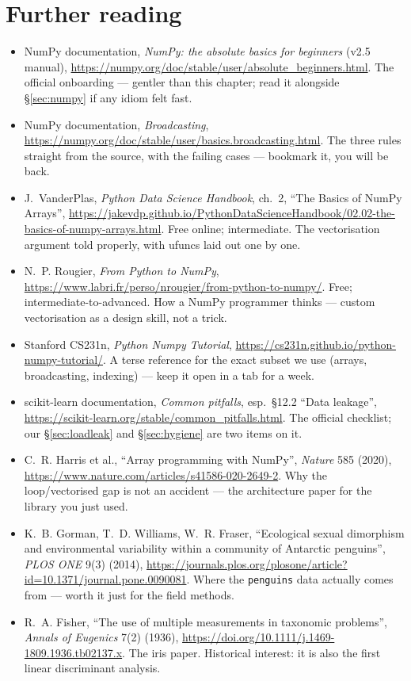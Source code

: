 \section*{Further reading}

\begin{itemize}
\item NumPy documentation, \emph{NumPy: the absolute basics for beginners}
  (v2.5 manual), \url{https://numpy.org/doc/stable/user/absolute_beginners.html}.
  The official onboarding --- gentler than this chapter; read it alongside
  \S\ref{sec:numpy} if any idiom felt fast.
\item NumPy documentation, \emph{Broadcasting},
  \url{https://numpy.org/doc/stable/user/basics.broadcasting.html}. The three
  rules straight from the source, with the failing cases --- bookmark it, you
  will be back.
\item J.~VanderPlas, \emph{Python Data Science Handbook}, ch.~2, ``The Basics
  of NumPy Arrays'', \url{https://jakevdp.github.io/PythonDataScienceHandbook/02.02-the-basics-of-numpy-arrays.html}.
  Free online; intermediate. The vectorisation argument told properly, with
  ufuncs laid out one by one.
\item N.~P. Rougier, \emph{From Python to NumPy},
  \url{https://www.labri.fr/perso/nrougier/from-python-to-numpy/}. Free;
  intermediate-to-advanced. How a NumPy programmer thinks --- custom
  vectorisation as a design skill, not a trick.
\item Stanford CS231n, \emph{Python Numpy Tutorial},
  \url{https://cs231n.github.io/python-numpy-tutorial/}. A terse reference for
  the exact subset we use (arrays, broadcasting, indexing) --- keep it open in
  a tab for a week.
\item scikit-learn documentation, \emph{Common pitfalls}, esp.~§12.2 ``Data
  leakage'', \url{https://scikit-learn.org/stable/common_pitfalls.html}. The
  official checklist; our \S\ref{sec:loadleak} and \S\ref{sec:hygiene} are two
  items on it.
\item C.~R. Harris et al., ``Array programming with NumPy'', \emph{Nature}
  585 (2020), \url{https://www.nature.com/articles/s41586-020-2649-2}. Why the
  loop/vectorised gap is not an accident --- the architecture paper for the
  library you just used.
\item K.~B. Gorman, T.~D. Williams, W.~R. Fraser, ``Ecological sexual
  dimorphism and environmental variability within a community of Antarctic
  penguins'', \emph{PLOS ONE} 9(3) (2014),
  \url{https://journals.plos.org/plosone/article?id=10.1371/journal.pone.0090081}.
  Where the \texttt{penguins} data actually comes from --- worth it just for
  the field methods.
\item R.~A. Fisher, ``The use of multiple measurements in taxonomic
  problems'', \emph{Annals of Eugenics} 7(2) (1936),
  \url{https://doi.org/10.1111/j.1469-1809.1936.tb02137.x}. The iris paper.
  Historical interest: it is also the first linear discriminant analysis.
\end{itemize}

